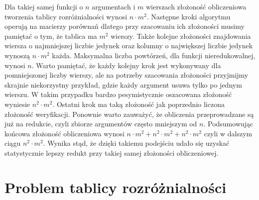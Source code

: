Dla takiej samej funkcji o $n$ argumentach i $m$ wierszach złożoność obliczeniowa tworzenia tablicy rozróżnialności wynosi $n \cdot m^2$.
Następne kroki algorytmu operują na macierzy porównań dlatego przy szacowaniu ich złożoności musimy pamiętać o tym, że tablica ma $m^2$ wierszy.
Także kolejne złożoności znajdowania wiersza o najmniejszej liczbie jedynek oraz kolumny o największej liczbie jedynek wynoszą $n \cdot m^2$ każda.
Maksymalna liczba powtórzeń, dla funkcji nieredukowalnej, wynosi $n$.
Warto pamiętać, że każdy kolejny krok jest wykonywany dla pomniejszonej liczby wierszy, ale na potrzeby szacowania złożoności przyjmijmy skrajnie niekorzystny przykład, gdzie każdy argument usuwa tylko po jednym wierszu.
W takim przypadku bardzo pesymistycznie oszacowana złożoność wyniesie $n^2 \cdot m^2$.
Ostatni krok ma taką złożoność jak poprzednio liczona złożoność weryfikacji.
Ponownie warto zauważyć, że obliczenia przeprowadzane są już na redukcie, czyli zbiorze argumentów często mniejszym od $n$.
Podsumowując końcowa złożoność obliczeniowa wynosi $n \cdot m^2 + n^2 \cdot m^2 + n^2 \cdot m^2$ czyli w dalszym ciągu $n^2 \cdot m^2$.
Wynika stąd, że dzięki takiemu podejściu udało się uzyskać statystycznie lepszy redukt przy takiej samej złożoności obliczeniowej.


\section{Problem tablicy rozróżnialności}

